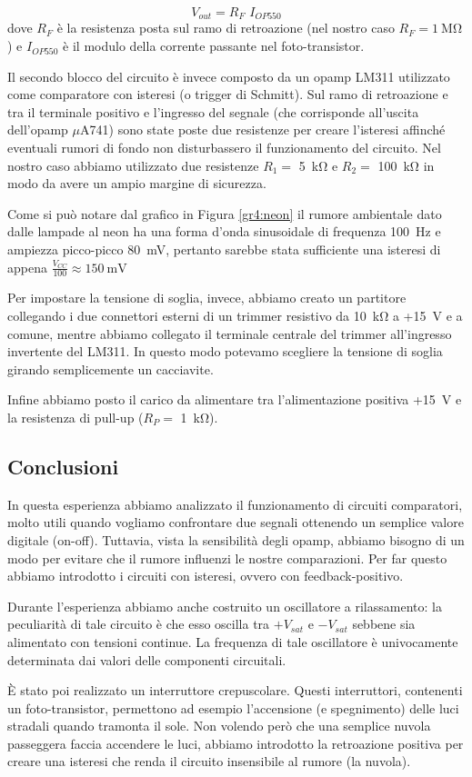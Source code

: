 \begin{equation}
	V_{out} = R_F \,\, I_{OP550}
\end{equation}
dove $R_F$ è la resistenza posta sul ramo di retroazione (nel nostro caso $R_F = \SI{1}{\Mohm}$) e $I_{OP550}$ è il modulo della corrente passante nel foto-transistor.

Il secondo blocco del circuito è invece composto da un opamp LM311 utilizzato come comparatore con isteresi (o trigger di Schmitt).
Sul ramo di retroazione e tra il terminale positivo e l'ingresso del segnale (che corrisponde all'uscita dell'opamp $\mu$A741) sono state poste due resistenze per creare l'isteresi affinché eventuali rumori di fondo non disturbassero il funzionamento del circuito.
Nel nostro caso abbiamo utilizzato due resistenze $R_1 =$ \SI{5}{\kohm} e $R_2=$ \SI{100}{\kohm} in modo da avere un ampio margine di sicurezza.

Come si può notare dal grafico in Figura \ref{gr4:neon} il rumore ambientale dato dalle lampade al neon ha una forma d'onda sinusoidale di frequenza \SI{100}{\hertz} e ampiezza picco-picco \SI{80}{\mV}, pertanto sarebbe stata sufficiente una isteresi di appena $\frac{V_{CC}}{100} \approx \SI{150}{\mV}$

Per impostare la tensione di soglia, invece, abbiamo creato un partitore collegando i due connettori esterni di un trimmer resistivo da \SI{10}{\kohm} a +\SI{15}{\V} e a comune, mentre abbiamo collegato il terminale centrale del trimmer all'ingresso invertente del LM311.
In questo modo potevamo scegliere la tensione di soglia girando semplicemente un cacciavite.

Infine abbiamo posto il carico da alimentare tra l'alimentazione positiva +\SI{15}{\V} e la resistenza di pull-up ($R_P=$ \SI{1}{\kohm}).

\subsection*{Conclusioni}

In questa esperienza abbiamo analizzato il funzionamento di circuiti comparatori, molto utili quando vogliamo confrontare due segnali ottenendo un semplice valore digitale (on-off).
Tuttavia, vista la sensibilità degli opamp, abbiamo bisogno di un modo per evitare che il rumore influenzi le nostre comparazioni.
Per far questo abbiamo introdotto i circuiti con isteresi, ovvero con feedback-positivo.

Durante l'esperienza abbiamo anche costruito un oscillatore a rilassamento: la peculiarità di tale circuito è che esso oscilla tra $+V_{sat}$ e $-V_{sat}$ sebbene sia alimentato con tensioni continue.
La frequenza di tale oscillatore è univocamente determinata dai valori delle componenti circuitali.

È stato poi realizzato un interruttore crepuscolare.
Questi interruttori, contenenti un foto-transistor, permettono ad esempio l'accensione (e spegnimento) delle luci stradali quando tramonta il sole.
Non volendo però che una semplice nuvola passeggera faccia accendere le luci, abbiamo introdotto la retroazione positiva per creare una isteresi che renda il circuito insensibile al rumore (la nuvola).